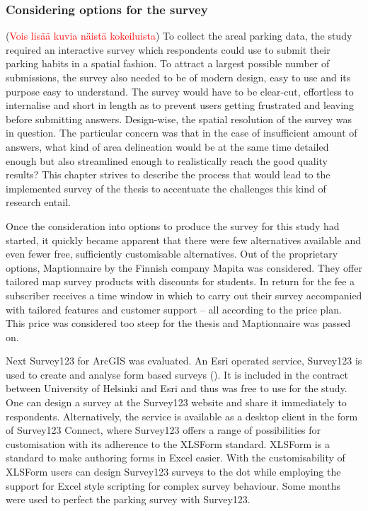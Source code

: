 \subsubsection{Considering options for the survey}
\justify
(\textcolor{red}{Vois lisää kuvia näistä kokeiluista}) To collect the areal parking data, the study required an interactive survey which respondents could use to submit their parking habits in a spatial fashion. To attract a largest possible number of submissions, the survey also needed to be of modern design, easy to use and its purpose easy to understand. The survey would have to be clear-cut, effortless to internalise and short in length as to prevent users getting frustrated and leaving before submitting answers. Design-wise, the spatial resolution of the survey was in question. The particular concern was that in the case of insufficient amount of answers, what kind of area delineation would be at the same time detailed enough but also streamlined enough to realistically reach the good quality results? This chapter strives to describe the process that would lead to the implemented survey of the thesis to accentuate the challenges this kind of research entail.

Once the consideration into options to produce the survey for this study had started, it quickly became apparent that there were few alternatives available and even fewer free, sufficiently customisable alternatives. Out of the proprietary options, Maptionnaire by the Finnish company Mapita was considered. They offer tailored map survey products with discounts for students. In return for the fee a subscriber receives a time window in which to carry out their survey accompanied with tailored features and customer support -- all according to the price plan. This price was considered too steep for the thesis and Maptionnaire was passed on. 

Next Survey123 for ArcGIS was evaluated. An Esri operated service, Survey123 is used to create and analyse form based surveys (\cite{Esri}). It is included in the contract between University of Helsinki and Esri and thus was free to use for the study. One can design a survey at the Survey123 website and share it immediately to respondents. Alternatively, the service is available as a desktop client in the form of Survey123 Connect, where Survey123 offers a range of possibilities for customisation with its adherence to the XLSForm standard. XLSForm is a standard to make authoring forms in Excel easier. With the customisability of XLSForm users can design Survey123 surveys to the dot while employing the support for Excel style scripting for complex survey behaviour. Some months were used to perfect the parking survey with Survey123. 

